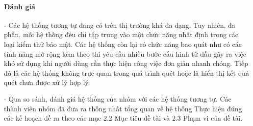 \paragraph{Đánh giá}
\tab - Các hệ thống tương tự đang có trên thị trường khá đa dạng.
Tuy nhiên, đa phần, mỗi hệ thống đều chỉ tập trung vào một chức năng nhất định trong các loại kiểm thử bảo mật.
Các hệ thống còn lại có chức năng bao quát như \applicationname có các tính năng mở rộng kèm theo thì yêu cầu nhiều bước cấu hình từ đầu gây ra việc khó sử dụng khi người dùng cần thực hiện công việc đơn giản nhanh chóng.
Tiếp đó là các hệ thống không trực quan trong quá trình quét hoặc là hiển thị kết quả quét chưa được xử lý hợp lý.
\newline

- Qua so sánh, đánh giá hệ thống của nhóm với các hệ thống tương tự. 
Các thành viên nhóm đã đưa ra thống nhất tổng quan về hệ thống \applicationname Thực hiện đúng các kế
hoạch đề ra theo các mục 2.2 Mục tiêu đề tài và 2.3 Phạm vi của đề tài.

